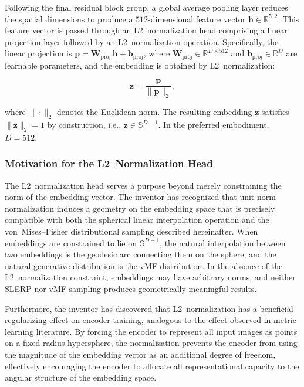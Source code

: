 \documentclass[12pt,letterpaper]{article}
\newcommand{\bz}{\mathbf{z}}
\newcommand{\RR}{\mathbb{R}}
\newcommand{\Sphere}{\mathbb{S}}
\begin{document}
Following the final residual block group, a global average pooling layer
reduces the spatial dimensions to produce a $512$-dimensional feature vector
$\mathbf{h} \in \RR^{512}$.  This feature vector is passed through an
L2~normalization head comprising a linear projection layer followed by an
L2~normalization operation.  Specifically, the linear projection is
$\mathbf{p} = \mathbf{W}_{\text{proj}}\,\mathbf{h} +
\mathbf{b}_{\text{proj}}$, where
$\mathbf{W}_{\text{proj}} \in \RR^{D \times 512}$ and
$\mathbf{b}_{\text{proj}} \in \RR^D$ are learnable parameters, and the
embedding is obtained by L2~normalization:

\begin{equation}
  \bz = \frac{\mathbf{p}}{\|\mathbf{p}\|_2},
  \label{eq:l2norm}
\end{equation}

\noindent where $\|\cdot\|_2$ denotes the Euclidean norm.  The resulting
embedding $\bz$ satisfies $\|\bz\|_2 = 1$ by construction, i.e.,
$\bz \in \Sphere^{D-1}$.  In the preferred embodiment, $D = 512$.

\subsubsection{Motivation for the L2~Normalization Head}

The L2~normalization head serves a purpose beyond merely constraining the
norm of the embedding vector.  The inventor has recognized that unit-norm
normalization induces a geometry on the embedding space that is precisely
compatible with both the spherical linear interpolation operation and the
von~Mises--Fisher distributional sampling described hereinafter.  When
embeddings are constrained to lie on $\Sphere^{D-1}$, the natural
interpolation between two embeddings is the geodesic arc connecting them on
the sphere, and the natural generative distribution is the vMF distribution.
In the absence of the L2~normalization constraint, embeddings may have
arbitrary norms, and neither SLERP nor vMF sampling produces geometrically
meaningful results.

Furthermore, the inventor has discovered that L2~normalization has a
beneficial regularizing effect on encoder training, analogous to the effect
observed in metric learning literature.  By forcing the encoder to represent
all input images as points on a fixed-radius hypersphere, the normalization
prevents the encoder from using the magnitude of the embedding vector as an
additional degree of freedom, effectively encouraging the encoder to allocate
all representational capacity to the angular structure of the embedding
space.
\end{document}
